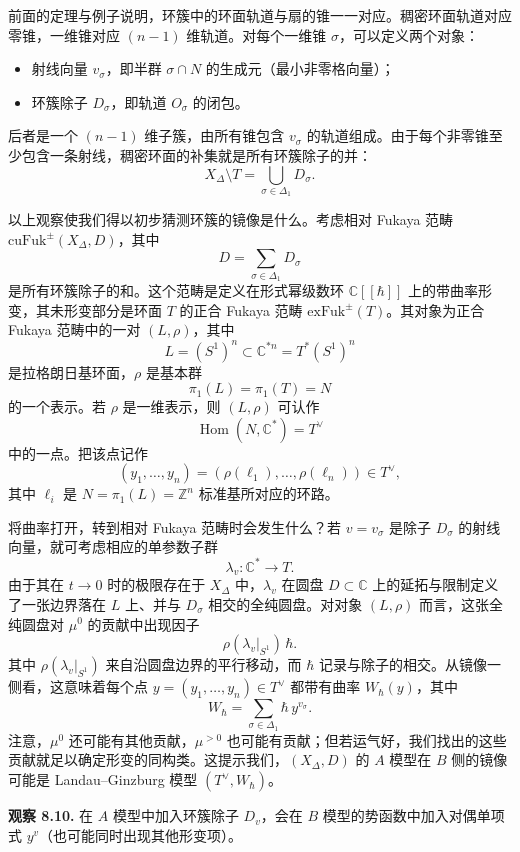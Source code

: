 前面的定理与例子说明，环簇中的环面轨道与扇的锥一一对应。稠密环面轨道对应零锥，一维锥对应 $(n-1)$ 维轨道。对每个一维锥 $\sigma$，可以定义两个对象：
\begin{itemize}
  \item 射线向量 $v_\sigma$，即半群 $\sigma\cap N$ 的生成元（最小非零格向量）；
  \item 环簇除子 $D_\sigma$，即轨道 $O_\sigma$ 的闭包。
\end{itemize}
后者是一个 $(n-1)$ 维子簇，由所有锥包含 $v_\sigma$ 的轨道组成。由于每个非零锥至少包含一条射线，稠密环面的补集就是所有环簇除子的并：
\[
  X_\Delta\setminus T=\bigcup_{\sigma\in\Delta_1}D_\sigma.
\]

以上观察使我们得以初步猜测环簇的镜像是什么。考虑相对 Fukaya 范畴 $\mathrm{cuFuk}^{\pm}(X_\Delta,D)$，其中
\[
  D=\sum_{\sigma\in\Delta_1}D_\sigma
\]
是所有环簇除子的和。这个范畴是定义在形式幂级数环 $\mathbb C[[\hbar]]$ 上的带曲率形变，其未形变部分是环面 $T$ 的正合 Fukaya 范畴 $\mathrm{exFuk}^{\pm}(T)$。其对象为正合 Fukaya 范畴中的一对 $(L,\rho)$，其中
\[
  L=(S^1)^n\subset\mathbb C^{*n}=T^*(S^1)^n
\]
是拉格朗日基环面，$\rho$ 是基本群
\[
  \pi_1(L)=\pi_1(T)=N
\]
的一个表示。若 $\rho$ 是一维表示，则 $(L,\rho)$ 可认作
\[
  \operatorname{Hom}(N,\mathbb C^*)=T^\vee
\]
中的一点。把该点记作
\[
  (y_1,\ldots,y_n)=(\rho(\ell_1),\ldots,\rho(\ell_n))\in T^\vee,
\]
其中 $\ell_i$ 是 $N=\pi_1(L)=\mathbb Z^n$ 标准基所对应的环路。

将曲率打开，转到相对 Fukaya 范畴时会发生什么？若 $v=v_\sigma$ 是除子 $D_\sigma$ 的射线向量，就可考虑相应的单参数子群
\[
  \lambda_v\colon\mathbb C^*\to T.
\]
由于其在 $t\to0$ 时的极限存在于 $X_\Delta$ 中，$\lambda_v$ 在圆盘 $D\subset\mathbb C$ 上的延拓与限制定义了一张边界落在 $L$ 上、并与 $D_\sigma$ 相交的全纯圆盘。对对象 $(L,\rho)$ 而言，这张全纯圆盘对 $\mu^0$ 的贡献中出现因子
\[
  \rho(\lambda_v|_{S^1})\,\hbar.
\]
其中 $\rho(\lambda_v|_{S^1})$ 来自沿圆盘边界的平行移动，而 $\hbar$ 记录与除子的相交。从镜像一侧看，这意味着每个点 $y=(y_1,\ldots,y_n)\in T^\vee$ 都带有曲率 $W_\hbar(y)$，其中
\[
  W_\hbar=\sum_{\sigma\in\Delta_1}\hbar\,y^{v_\sigma}.
\]
注意，$\mu^0$ 还可能有其他贡献，$\mu^{>0}$ 也可能有贡献；但若运气好，我们找出的这些贡献就足以确定形变的同构类。这提示我们，$(X_\Delta,D)$ 的 $A$ 模型在 $B$ 侧的镜像可能是 Landau--Ginzburg 模型 $(T^\vee,W_\hbar)$。

\begin{note}\label{note:toric-divisor-potential}
\textbf{观察 8.10.} 在 $A$ 模型中加入环簇除子 $D_v$，会在 $B$ 模型的势函数中加入对偶单项式 $y^v$（也可能同时出现其他形变项）。
\end{note}

